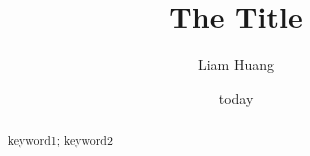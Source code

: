 \documentclass{mcmthesis}
\title{The Title}
\author{Liam Huang}
\date{today}
\begin{document}
\begin{abstract}
\blindtext                  %
\begin{keywords}
keyword1; keyword2
\end{keywords}
\end{abstract}

\maketitle                  %

\blindtext                  %
\end{document}
